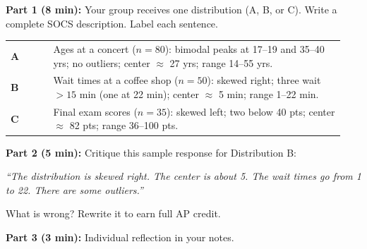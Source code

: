 \documentclass[aspectratio=169, 11pt]{beamer}
\begin{document}
{
\begin{frame}[t, plain]
  \vspace{0.8em}%
  \hspace{0.55cm}%
  \begin{minipage}{0.9\textwidth}
    \small

    \textbf{Part 1 (8 min):} Your group receives one distribution (A, B, or C).
    Write a complete SOCS description. Label each sentence.

    \vspace{0.5em}
    \begin{tabular}{@{} >{\bfseries}p{0.12\linewidth} p{0.82\linewidth} @{}}
      A & Ages at a concert ($n = 80$): bimodal peaks at 17--19 and 35--40 yrs;
          no outliers; center $\approx$ 27 yrs; range 14--55 yrs. \\[4pt]
      B & Wait times at a coffee shop ($n = 50$): skewed right; three wait
          $>15$ min (one at 22 min); center $\approx$ 5 min; range 1--22 min. \\[4pt]
      C & Final exam scores ($n = 35$): skewed left; two below 40 pts;
          center $\approx$ 82 pts; range 36--100 pts.
    \end{tabular}

    \vspace{0.6em}
    \textbf{Part 2 (5 min):} Critique this sample response for Distribution B:
    \begin{tcolorbox}[colback=white, colframe=redacc, boxrule=0.6pt, arc=1.5mm,
        left=2mm, right=2mm, top=1mm, bottom=1mm]
    \small\textit{``The distribution is skewed right.
    The center is about 5. The wait times go from 1 to 22.
    There are some outliers.''}
    \end{tcolorbox}
    What is wrong? Rewrite it to earn full AP credit.

    \vspace{0.4em}
    \textbf{Part 3 (3 min):} Individual reflection in your notes.
  \end{minipage}
\end{frame}
}
\end{document}
